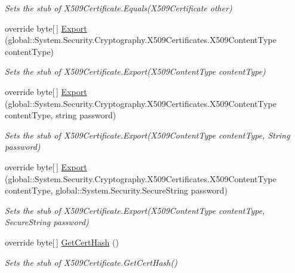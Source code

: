 \begin{DoxyCompactItemize}
\begin{DoxyCompactList}\small\item\em Sets the stub of X509\-Certificate.\-Equals(\-X509\-Certificate other)\end{DoxyCompactList}\item 
override byte\mbox{[}$\,$\mbox{]} \hyperlink{class_system_1_1_security_1_1_cryptography_1_1_x509_certificates_1_1_fakes_1_1_stub_x509_certificate2_a0f7d604e079694f10bafff18780e29e7}{Export} (global\-::\-System.\-Security.\-Cryptography.\-X509\-Certificates.\-X509\-Content\-Type content\-Type)
\begin{DoxyCompactList}\small\item\em Sets the stub of X509\-Certificate.\-Export(\-X509\-Content\-Type content\-Type)\end{DoxyCompactList}\item 
override byte\mbox{[}$\,$\mbox{]} \hyperlink{class_system_1_1_security_1_1_cryptography_1_1_x509_certificates_1_1_fakes_1_1_stub_x509_certificate2_abae0e3545e3630bae7c26450273cfde9}{Export} (global\-::\-System.\-Security.\-Cryptography.\-X509\-Certificates.\-X509\-Content\-Type content\-Type, string password)
\begin{DoxyCompactList}\small\item\em Sets the stub of X509\-Certificate.\-Export(\-X509\-Content\-Type content\-Type, String password)\end{DoxyCompactList}\item 
override byte\mbox{[}$\,$\mbox{]} \hyperlink{class_system_1_1_security_1_1_cryptography_1_1_x509_certificates_1_1_fakes_1_1_stub_x509_certificate2_aae2fc2f6a510ef1487bd865722079964}{Export} (global\-::\-System.\-Security.\-Cryptography.\-X509\-Certificates.\-X509\-Content\-Type content\-Type, global\-::\-System.\-Security.\-Secure\-String password)
\begin{DoxyCompactList}\small\item\em Sets the stub of X509\-Certificate.\-Export(\-X509\-Content\-Type content\-Type, Secure\-String password)\end{DoxyCompactList}\item 
override byte\mbox{[}$\,$\mbox{]} \hyperlink{class_system_1_1_security_1_1_cryptography_1_1_x509_certificates_1_1_fakes_1_1_stub_x509_certificate2_ac16f557bc9ed4e81a3b2a10401d82756}{Get\-Cert\-Hash} ()
\begin{DoxyCompactList}\small\item\em Sets the stub of X509\-Certificate.\-Get\-Cert\-Hash()\end{DoxyCompactList}\item 

\end{DoxyCompactItemize}
